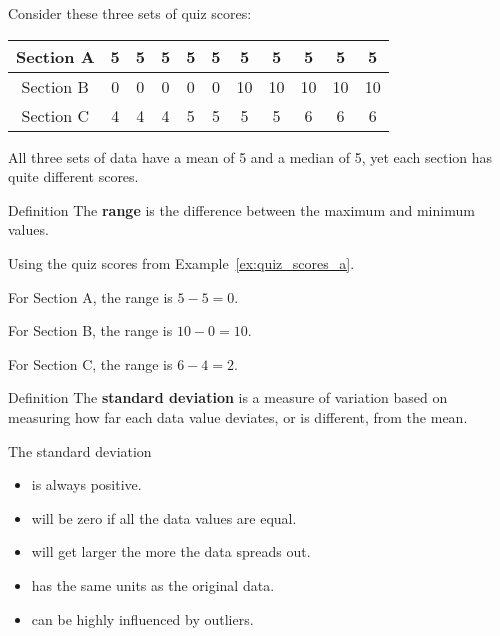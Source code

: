\documentclass{beamer}
\begin{document}
\begin{frame}
\begin{example}\label{ex:quiz_scores_a}
Consider these three sets of quiz scores:
\begin{center}
\begin{tabular}{|c|cccccccccc|}
\hline
Section A & 5 & 5 & 5 & 5 & 5 & 5 & 5 & 5 & 5 & 5 \\ \hline
Section B & 0 & 0 & 0 & 0 & 0 & 10 & 10 & 10 & 10 & 10 \\ \hline
Section C & 4 & 4 & 4 & 5 & 5 & 5 & 5 & 6 & 6 & 6 \\ \hline
\end{tabular}
\end{center}
All three sets of data have a mean of 5 and a median of 5, yet each section has quite different scores.
\end{example}\pause

\begin{block}{Definition}
The \textbf{range} is the difference between the maximum and minimum values.
\end{block}\pause

\begin{example}
Using the quiz scores from Example~\ref{ex:quiz_scores_a}.

For Section A, the range is $5-5=0$. \pause

For Section B, the range is $10-0=10$.  \pause

For Section C, the range is $6-4=2$. 
\end{example}
\end{frame}

\begin{frame}
\begin{block}{Definition}
The \textbf{standard deviation} is a measure of variation based on measuring how far each data value deviates, or is different, from the mean.

\vspace{2mm}
The standard deviation 
\begin{itemize}[<+- | alert@+>]
\item is always positive. 
\item will be zero if all the data values are equal.
\item will get larger the more the data spreads out.
\item has the same units as the original data.
\item can be highly influenced by outliers.
\end{itemize}
\end{block}
\end{frame}
\end{document}
